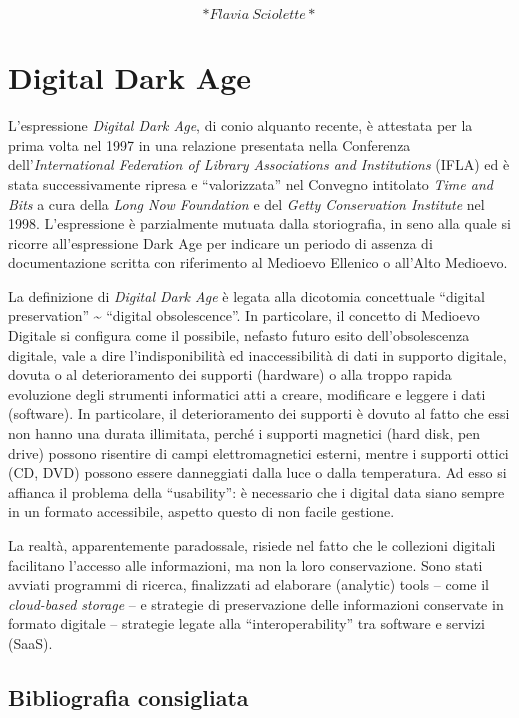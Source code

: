 \documentclass[
  b5paper,
  twoside,
  12pt,
  chapterprefix=false,
  bibliography=totocnumbered,
  parskip=false]{scrbook}
\begin{document}
\[*Flavia~Sciolette*\]

\hypertarget{digital-dark-age}{%
\chapter{Digital Dark Age}\label{digital-dark-age}}

L'espressione \emph{Digital Dark Age}, di conio alquanto recente, è attestata
per la prima volta nel 1997 in una relazione presentata nella Conferenza
dell'\emph{International Federation of Library Associations and Institutions}
(IFLA) ed è stata successivamente ripresa e \enquote{valorizzata} nel Convegno
intitolato \emph{Time and Bits} a cura della \emph{Long Now Foundation} e del
\emph{Getty Conservation Institute} nel 1998. L'espressione è parzialmente
mutuata dalla storiografia, in seno alla quale si ricorre
all'espressione Dark Age per indicare un periodo di assenza di
documentazione scritta con riferimento al Medioevo Ellenico o all'Alto
Medioevo.

La definizione di \emph{Digital Dark Age} è legata alla dicotomia concettuale
\enquote{digital preservation} \textasciitilde{} \enquote{digital obsolescence}. In particolare, il
concetto di Medioevo Digitale si configura come il possibile, nefasto
futuro esito dell'obsolescenza digitale, vale a dire l'indisponibilità
ed inaccessibilità di dati in supporto digitale, dovuta o al
deterioramento dei supporti (hardware) o alla troppo rapida evoluzione
degli strumenti informatici atti a creare, modificare e leggere i dati
(software). In particolare, il deterioramento dei supporti è dovuto al
fatto che essi non hanno una durata illimitata, perché i supporti
magnetici (hard disk, pen drive) possono risentire di campi
elettromagnetici esterni, mentre i supporti ottici (CD, DVD) possono
essere danneggiati dalla luce o dalla temperatura. Ad esso si affianca
il problema della \enquote{usability}: è necessario che i digital data siano
sempre in un formato accessibile, aspetto questo di non facile gestione.

La realtà, apparentemente paradossale, risiede nel fatto che le
collezioni digitali facilitano l'accesso alle informazioni, ma non la
loro conservazione. Sono stati avviati programmi di ricerca, finalizzati
ad elaborare (analytic) tools -- come il \emph{cloud-based storage} -- e
strategie di preservazione delle informazioni conservate in formato
digitale -- strategie legate alla \enquote{interoperability} tra software e
servizi (SaaS).

\hypertarget{bibliografia-consigliata-6}{%
\section*{Bibliografia consigliata}\label{bibliografia-consigliata-6}}
\end{document}
